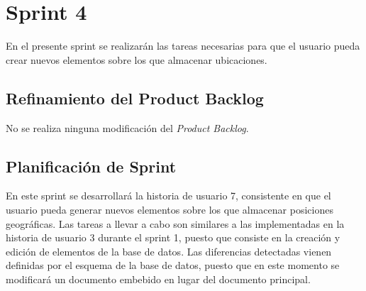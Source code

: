 \section{Sprint 4}
	En el presente sprint se realizarán las tareas necesarias para que el usuario pueda crear nuevos elementos sobre los que almacenar ubicaciones.
	
	\subsection{Refinamiento del Product Backlog}
	No se realiza ninguna modificación del \textit{Product Backlog}.
	
	\subsection{Planificación de Sprint}
	En este sprint se desarrollará la historia de usuario 7, consistente en que el usuario pueda generar nuevos elementos sobre los que almacenar posiciones geográficas. Las tareas a llevar a cabo son similares a las implementadas en la historia de usuario 3 durante el sprint 1, puesto que consiste en la creación y edición de elementos de la base de datos. Las diferencias detectadas vienen definidas por el esquema de la base de datos, puesto que en este momento se modificará un documento embebido en lugar del documento principal.
	
